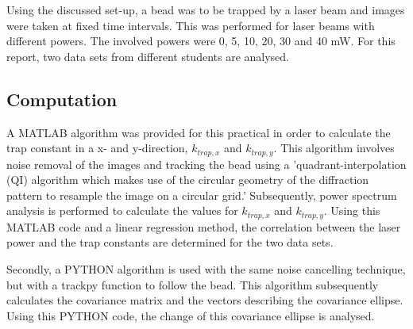 Using the discussed set-up, a bead was to be trapped by a laser beam and images were taken at fixed time intervals. This was performed for laser beams with different powers. The involved powers were 0, 5, 10, 20, 30 and 40 mW. For this report, two data sets from different students are analysed.

\subsection{Computation}

A MATLAB algorithm was provided for this practical in order to calculate the trap constant in a x- and y-direction, $k_{trap,x}$ and $k_{trap,y}$. This algorithm involves noise removal of the images and tracking the bead using a 'quadrant-interpolation (QI) algorithm  which makes use of the circular geometry of the diffraction pattern to resample the image on a circular grid.' \cite{loenhout} Subsequently, power spectrum analysis is performed to calculate the values for $k_{trap,x}$ and $k_{trap,y}$. Using this MATLAB code and a linear regression method, the correlation between the laser power and the trap constants are determined for the two data sets.

Secondly, a PYTHON algorithm is used with the same noise cancelling technique, but with a trackpy function to follow the bead. This algorithm subsequently calculates the covariance matrix and the vectors describing the covariance ellipse. Using this PYTHON code, the change of this covariance ellipse is analysed.



